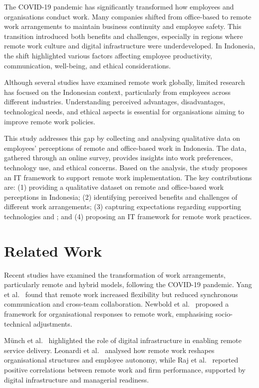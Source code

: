 \documentclass[a4paper, conference]{IEEEtran}
\begin{document}
The COVID-19 pandemic has significantly transformed how employees and organisations conduct work. Many companies shifted from office-based to remote work arrangements to maintain business continuity and employee safety. This transition introduced both benefits and challenges, especially in regions where remote work culture and digital infrastructure were underdeveloped. In Indonesia, the shift highlighted various factors affecting employee productivity, communication, well-being, and ethical considerations.

Although several studies have examined remote work globally, limited research has focused on the Indonesian context, particularly from employees across different industries. Understanding perceived advantages, disadvantages, technological needs, and ethical aspects is essential for organisations aiming to improve remote work policies.

This study addresses this gap by collecting and analysing qualitative data on employees' perceptions of remote and office-based work in Indonesia. The data, gathered through an online survey, provides insights into work preferences, technology use, and ethical concerns. Based on the analysis, the study proposes an IT framework to support remote work implementation. The key contributions are: (1) providing a qualitative dataset on remote and office-based work perceptions in Indonesia; (2) identifying perceived benefits and challenges of different work arrangements; (3) capturing expectations regarding supporting technologies and ; and (4) proposing an IT framework for remote work practices.


\section{Related Work}

Recent studies have examined the transformation of work arrangements, particularly remote and hybrid models, following the COVID-19 pandemic. Yang et al.~\cite{yang2022effects} found that remote work increased flexibility but reduced synchronous communication and cross-team collaboration. Newbold et al.~\cite{Newbold2022NewNormals} proposed a framework for organisational responses to remote work, emphasising socio-technical adjustments.

Münch et al.~\cite{munch2022capabilities} highlighted the role of digital infrastructure in enabling remote service delivery. Leonardi et al.~\cite{Leonardi2024RemoteWork} analysed how remote work reshapes organisational structures and employee autonomy, while Raj et al.~\cite{Raj2023Remote} reported positive correlations between remote work and firm performance, supported by digital infrastructure and managerial readiness.
\end{document}
